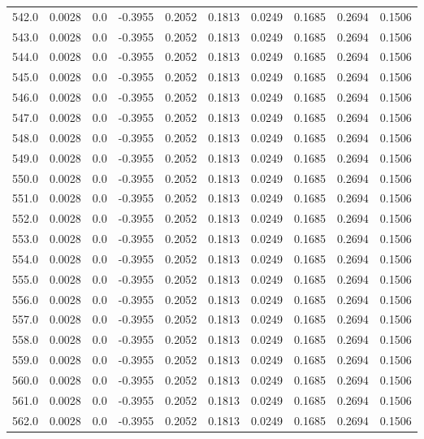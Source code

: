 \begin{longtable}{lrrrrrrrrr}
542.0 & 0.0028 & 0.0 & -0.3955 & 0.2052 & 0.1813 & 0.0249 & 0.1685 & 0.2694 & 0.1506 \\
543.0 & 0.0028 & 0.0 & -0.3955 & 0.2052 & 0.1813 & 0.0249 & 0.1685 & 0.2694 & 0.1506 \\
544.0 & 0.0028 & 0.0 & -0.3955 & 0.2052 & 0.1813 & 0.0249 & 0.1685 & 0.2694 & 0.1506 \\
545.0 & 0.0028 & 0.0 & -0.3955 & 0.2052 & 0.1813 & 0.0249 & 0.1685 & 0.2694 & 0.1506 \\
546.0 & 0.0028 & 0.0 & -0.3955 & 0.2052 & 0.1813 & 0.0249 & 0.1685 & 0.2694 & 0.1506 \\
547.0 & 0.0028 & 0.0 & -0.3955 & 0.2052 & 0.1813 & 0.0249 & 0.1685 & 0.2694 & 0.1506 \\
548.0 & 0.0028 & 0.0 & -0.3955 & 0.2052 & 0.1813 & 0.0249 & 0.1685 & 0.2694 & 0.1506 \\
549.0 & 0.0028 & 0.0 & -0.3955 & 0.2052 & 0.1813 & 0.0249 & 0.1685 & 0.2694 & 0.1506 \\
550.0 & 0.0028 & 0.0 & -0.3955 & 0.2052 & 0.1813 & 0.0249 & 0.1685 & 0.2694 & 0.1506 \\
551.0 & 0.0028 & 0.0 & -0.3955 & 0.2052 & 0.1813 & 0.0249 & 0.1685 & 0.2694 & 0.1506 \\
552.0 & 0.0028 & 0.0 & -0.3955 & 0.2052 & 0.1813 & 0.0249 & 0.1685 & 0.2694 & 0.1506 \\
553.0 & 0.0028 & 0.0 & -0.3955 & 0.2052 & 0.1813 & 0.0249 & 0.1685 & 0.2694 & 0.1506 \\
554.0 & 0.0028 & 0.0 & -0.3955 & 0.2052 & 0.1813 & 0.0249 & 0.1685 & 0.2694 & 0.1506 \\
555.0 & 0.0028 & 0.0 & -0.3955 & 0.2052 & 0.1813 & 0.0249 & 0.1685 & 0.2694 & 0.1506 \\
556.0 & 0.0028 & 0.0 & -0.3955 & 0.2052 & 0.1813 & 0.0249 & 0.1685 & 0.2694 & 0.1506 \\
557.0 & 0.0028 & 0.0 & -0.3955 & 0.2052 & 0.1813 & 0.0249 & 0.1685 & 0.2694 & 0.1506 \\
558.0 & 0.0028 & 0.0 & -0.3955 & 0.2052 & 0.1813 & 0.0249 & 0.1685 & 0.2694 & 0.1506 \\
559.0 & 0.0028 & 0.0 & -0.3955 & 0.2052 & 0.1813 & 0.0249 & 0.1685 & 0.2694 & 0.1506 \\
560.0 & 0.0028 & 0.0 & -0.3955 & 0.2052 & 0.1813 & 0.0249 & 0.1685 & 0.2694 & 0.1506 \\
561.0 & 0.0028 & 0.0 & -0.3955 & 0.2052 & 0.1813 & 0.0249 & 0.1685 & 0.2694 & 0.1506 \\
562.0 & 0.0028 & 0.0 & -0.3955 & 0.2052 & 0.1813 & 0.0249 & 0.1685 & 0.2694 & 0.1506 \\

\end{longtable}
